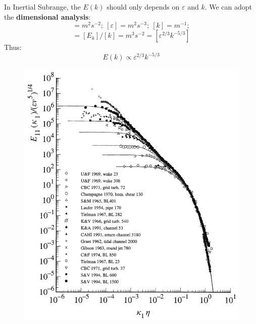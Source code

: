\documentclass[12pt]{article}
\begin{document}
        In Inertial Subrange, the $E(k)$ should only depends on $\varepsilon$ and $k$. We can adopt the \textbf{dimensional analysis}:
        \begin{equation}
            [E_k]  = m^2s^{-2};\ [\varepsilon] = m^2s^{-3};\ [k] = m^{-1};
        \end{equation}
        \begin{equation}
            [E(k)]=[E_k]/[k] = m^3s^{-2} = [\varepsilon^{2/3}k^{-5/3}]
        \end{equation}
        Thus:
        \begin{equation}
            E(k) \propto \varepsilon^{2/3}k^{-5/3}
        \end{equation}
        \clearpage
            \begin{figure}[hb]
              \centering
              \includegraphics[totalheight=105 mm]{img/experiments.jpg}
            \end{figure}
        \clearpage
        \begin{small}
        \cite{2000ApJ...539L.133P}
        \end{small}
\end{document}
